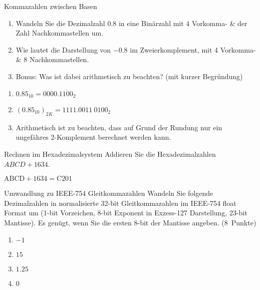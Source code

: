 \documentclass{article}
\begin{document}
\begin{exercise}{Kommazahlen zwischen Basen}
  \begin{enumerate}
    \item Wandeln Sie die Dezimalzahl $0.8$ in eine Binärzahl mit 4 Vorkomma- \& der Zahl Nachkommastellen um.\points[4]
    \item Wie lautet die Darstellung von $-0.8$ im Zweierkomplement, mit 4 Vorkomma- \& 8 Nachkommastellen.\points[2]
    \item Bonus: Was ist dabei arithmetisch zu beachten? (mit kurzer Begründung)\points[3]
  \end{enumerate}
\end{exercise}

\begin{solution}
  \begin{enumerate}
    \item $0.85_{10} = {0000.\overline{1100}}_2$
    \item $ (0.85_{10})_{2K} = {1111.0011\ 0100}_2$
    \item Arithmetisch ist zu beachten, dass auf Grund der Rundung nur ein ungefähres 2-Komplement berechnet werden kann.
  \end{enumerate}
\end{solution}

\begin{exercise}{Rechnen im Hexadezimalsystem}
  Addieren Sie die Hexadezimalzahlen $ABCD + 1634$.\points[4]

  \begin{solution}
    $\mathrm{ABCD} + \mathrm{1634} = \mathrm{C201}$
  \end{solution}
\end{exercise}

\begin{exercise}{Umwandlung zu IEEE-754 Gleitkommazahlen}
  Wandeln Sie folgende Dezimalzahlen in normalisierte 32-bit Gleitkommazahlen im IEEE-754 float Format um (1-bit Vorzeichen, 8-bit Exponent in Exzess-127 Darstellung, 23-bit Mantisse). Es genügt, wenn Sie die ersten 8-bit der Mantisse angeben. (8~Punkte)
  \begin{enumerate}
    \item $-1$
    \item $15$
    \item $1.25$
    \item $0$
  \end{enumerate}
\end{exercise}
\end{document}
